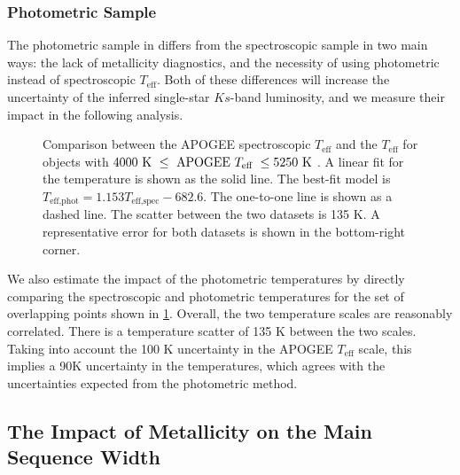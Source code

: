 \documentclass[twocolumn]{aastex6}
\newcommand{\Teff}{\ensuremath{T_{\textrm{eff}}}}
\begin{document}
\subsubsection{Photometric Sample}

The photometric sample in \citet{McQuillan14} differs from the spectroscopic
sample in two main ways: the lack of metallicity diagnostics, and the necessity
of using photometric instead of spectroscopic \Teff{}. Both of these
differences will increase the uncertainty of the inferred single-star 
\(Ks\)-band luminosity, and we measure their impact in the following analysis.


\begin{figure}[htb]
    \centering
    \caption{Comparison between the APOGEE spectroscopic \Teff{} and the
        \citet{Pinsonneault12} \Teff{} for objects with \(4000 \textrm{ K } \le
    \textrm{ APOGEE \Teff{} } \le 5250 \textrm{ K }\). A linear fit for the
    temperature is shown as the solid line. The best-fit model is
    \(T_{\textrm{eff,phot}} = 1.153 T_{\textrm{eff,spec}} - 682.6\). The 
    one-to-one line is shown as a dashed line. The scatter between the two 
    datasets is 135 K. A representative error for both datasets is shown in 
the bottom-right corner.}\label{fig:teffdiff}
\end{figure}

We also estimate the impact of the photometric temperatures by directly 
comparing the spectroscopic and photometric temperatures for the set of 
overlapping points shown in \cref{fig:teffdiff}. Overall, the two temperature scales are reasonably
correlated. There is a temperature scatter of 135 K between the two scales.
Taking into account the 100 K uncertainty in the APOGEE \Teff{} scale, this
implies a 90K uncertainty in the \citet{Pinsonneault12} temperatures, which
agrees with the uncertainties expected from the photometric method. 

\subsection{The Impact of Metallicity on the Main Sequence Width}
\label{sec:mswidth}
\end{document}

